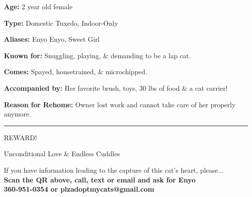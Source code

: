 \documentclass[12pt,a4paper]{article}
\begin{document}
\begin{tcolorbox}[
    colback=white!5!white,
    colframe=black!75!black,
    boxrule=3pt,
    arc=1mm,
    sharp corners=all,
    center title,
    bottomrule=2pt,
    toprule=2pt
]
\begin{center}
\begin{multicols}{2}
        \columnbreak
    \begin{flushleft}
    {\fontsize{18}{22}\selectfont
    \textbf{Age:} 2 year old female \par
    \vspace{0.4cm}
    \textbf{Type:} Domestic Tuxedo, Indoor-Only \par
    \vspace{0.4cm}
    \textbf{Aliases:} Enyo Enyo, Sweet Girl \par
    \vspace{0.4cm}
    \textbf{Known for:} Snuggling, playing, \& demanding to be a lap cat. \par
    \vspace{0.4cm}
    \textbf{Comes:} Spayed, housetrained, \& microchipped. \par
    \vspace{0.4cm}
    \textbf{Accompanied by:} Her favorite brush, toys, 30 lbs of food \& a cat carrier! \par
    \vspace{0.4cm}
    \textbf{Reason for Rehome:} Owner lost work and cannot take care of her properly anymore. \par
    \vspace{0.4cm}
    }
    \end{flushleft}
    \end{multicols}    
    
    \hrule
    \vspace{0.5cm}

    {\nashville\fontsize{110}{120}\selectfont REWARD!}\par
    \vspace{0.3cm}
    {\nashville\fontsize{50}{60}\selectfont Unconditional Love \& Endless Cuddles}\par
    \vspace{0.5cm}

    {\fontsize{14}{16}\selectfont If you have information leading to the capture of this cat's heart, please...} \\
    \vspace{0.2cm}
    {\large\bfseries Scan the QR above, call, text or email and ask for Enyo} \\
    {\large\bfseries 360-951-0354 or plzadoptmycats@gmail.com}

\end{center}
\end{tcolorbox}

\newpage

\end{document}
